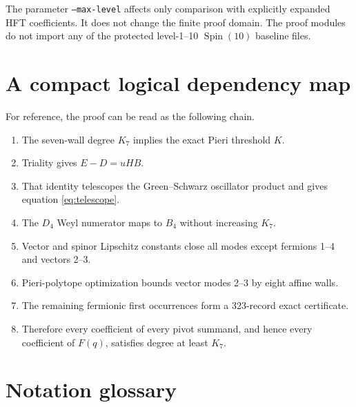 \documentclass[11pt,a4paper]{article}
\theoremstyle{definition}
\newcommand{\Spin}{\operatorname{Spin}}
\newcommand{\Kseven}{K_{7}}
\begin{document}
The parameter \texttt{--max-level} affects only comparison with explicitly
expanded HFT coefficients.  It does not change the finite proof domain.  The
proof modules do not import any of the protected level-1--10 $\Spin(10)$
baseline files.

\appendix

\section{A compact logical dependency map}

For reference, the proof can be read as the following chain.
\begin{enumerate}
  \item The seven-wall degree $\Kseven$ implies the exact Pieri threshold
        $K$.
  \item Triality gives $E-D=uHB$.
  \item That identity telescopes the Green--Schwarz oscillator product and
        gives equation \eqref{eq:telescope}.
  \item The $D_4$ Weyl numerator maps to $B_4$ without increasing
        $\Kseven$.
  \item Vector and spinor Lipschitz constants close all modes except
        fermions 1--4 and vectors 2--3.
  \item Pieri-polytope optimization bounds vector modes 2--3 by eight affine
        walls.
  \item The remaining fermionic first occurrences form a 323-record exact
        certificate.
  \item Therefore every coefficient of every pivot summand, and hence every
        coefficient of $F(q)$, satisfies degree at least $\Kseven$.
\end{enumerate}

\section{Notation glossary}
\end{document}
